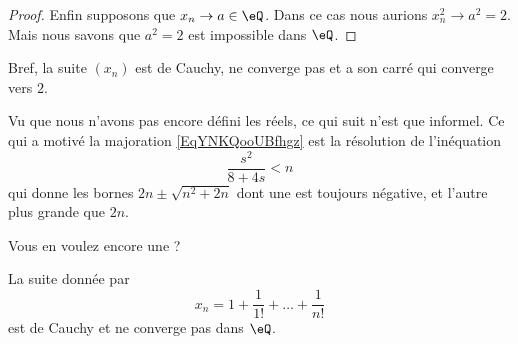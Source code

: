 \begin{proof}
    Enfin supposons que \( x_n\to a\in \eQ\). Dans ce cas nous aurions \( x_n^2\to a^2=2\). Mais nous savons que \( a^2=2\) est impossible dans \( \eQ\).
\end{proof}

Bref, la suite \( (x_n)\) est de Cauchy, ne converge pas et a son carré qui converge vers \( 2\).

\begin{remark}\label{RemUZCAooWNogzI}
    Vu que nous n'avons pas encore défini les réels, ce qui suit n'est que informel. Ce qui a motivé la majoration \eqref{EqYNKQooUBfhgz} est la résolution de l'inéquation
    \begin{equation}
        \frac{ s^2 }{ 8+4s }<n
    \end{equation}
    qui donne les bornes \( 2n\pm\sqrt{n^2+2n}\) dont une est toujours négative, et l'autre plus grande que \( 2n\).
\end{remark}    

Vous en voulez encore une ?

\begin{proposition}
    La suite donnée par
    \begin{equation}
        x_n=1+\frac{ 1 }{ 1! }+\ldots +\frac{1}{ n! }
    \end{equation}
    est de Cauchy et ne converge pas dans \( \eQ\).
\end{proposition}

